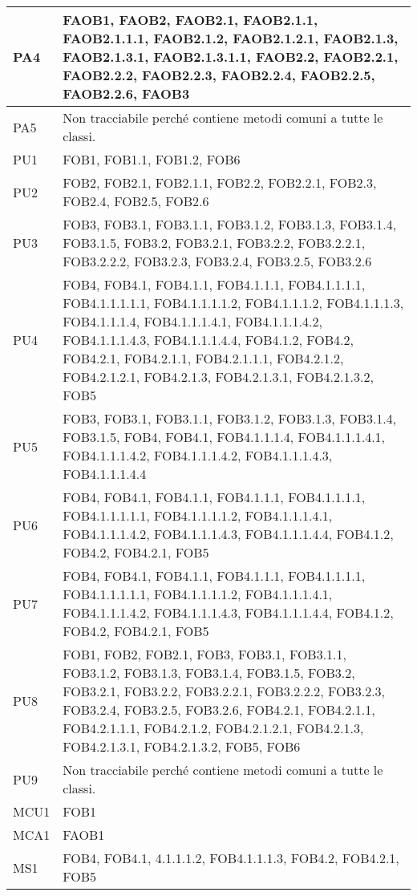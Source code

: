 {{\begin{longtable}{p{} p{}}
\midrule
PA4		&	{FAOB1, FAOB2, FAOB2.1, FAOB2.1.1, FAOB2.1.1.1, FAOB2.1.2, FAOB2.1.2.1, FAOB2.1.3, FAOB2.1.3.1, FAOB2.1.3.1.1, FAOB2.2, FAOB2.2.1, FAOB2.2.2, FAOB2.2.3, FAOB2.2.4, FAOB2.2.5, FAOB2.2.6, FAOB3}\\
\midrule
PA5	&    Non tracciabile perché contiene metodi comuni a tutte le classi.\\
\midrule
PU1		&	{FOB1, FOB1.1, FOB1.2, FOB6}\\
\midrule
PU2		&	{FOB2, FOB2.1, FOB2.1.1, FOB2.2, FOB2.2.1, FOB2.3, FOB2.4, FOB2.5, FOB2.6}\\
\midrule
PU3		&	{FOB3, FOB3.1, FOB3.1.1, FOB3.1.2, FOB3.1.3, FOB3.1.4, FOB3.1.5, FOB3.2, FOB3.2.1, FOB3.2.2, FOB3.2.2.1, FOB3.2.2.2, FOB3.2.3, FOB3.2.4, FOB3.2.5, FOB3.2.6}\\
\midrule
PU4		&	{FOB4, FOB4.1, FOB4.1.1, FOB4.1.1.1, FOB4.1.1.1.1, FOB4.1.1.1.1.1, FOB4.1.1.1.1.2, FOB4.1.1.1.2, FOB4.1.1.1.3, FOB4.1.1.1.4, FOB4.1.1.1.4.1, FOB4.1.1.1.4.2, FOB4.1.1.1.4.3, FOB4.1.1.1.4.4, FOB4.1.2, FOB4.2, FOB4.2.1, FOB4.2.1.1, FOB4.2.1.1.1, FOB4.2.1.2, FOB4.2.1.2.1, FOB4.2.1.3, FOB4.2.1.3.1,  FOB4.2.1.3.2, FOB5}\\
\midrule
PU5		&	{FOB3, FOB3.1, FOB3.1.1, FOB3.1.2, FOB3.1.3, FOB3.1.4, FOB3.1.5, FOB4, FOB4.1, FOB4.1.1.1.4, FOB4.1.1.1.4.1, FOB4.1.1.1.4.2, FOB4.1.1.1.4.2, FOB4.1.1.1.4.3, FOB4.1.1.1.4.4}\\
\midrule
PU6		&	{FOB4, FOB4.1, FOB4.1.1, FOB4.1.1.1, FOB4.1.1.1.1, FOB4.1.1.1.1.1, FOB4.1.1.1.1.2, FOB4.1.1.1.4.1, FOB4.1.1.1.4.2, FOB4.1.1.1.4.3, FOB4.1.1.1.4.4, FOB4.1.2, FOB4.2, FOB4.2.1, FOB5}\\
\midrule
PU7	&	{FOB4, FOB4.1, FOB4.1.1, FOB4.1.1.1, FOB4.1.1.1.1, FOB4.1.1.1.1.1, FOB4.1.1.1.1.2, FOB4.1.1.1.4.1, FOB4.1.1.1.4.2, FOB4.1.1.1.4.3, FOB4.1.1.1.4.4, FOB4.1.2, FOB4.2, FOB4.2.1, FOB5}\\
\midrule
PU8	&	{FOB1, FOB2, FOB2.1, FOB3, FOB3.1, FOB3.1.1, FOB3.1.2, FOB3.1.3, FOB3.1.4, FOB3.1.5, FOB3.2, FOB3.2.1, FOB3.2.2, FOB3.2.2.1, FOB3.2.2.2, FOB3.2.3,  FOB3.2.4, FOB3.2.5, FOB3.2.6, FOB4.2.1, FOB4.2.1.1, FOB4.2.1.1.1, FOB4.2.1.2, FOB4.2.1.2.1, FOB4.2.1.3, FOB4.2.1.3.1, FOB4.2.1.3.2, FOB5, FOB6}\\
\midrule
PU9 &	Non tracciabile perché contiene metodi comuni a tutte le classi.\\
\midrule
MCU1 & {FOB1}\\
\midrule
MCA1 & {FAOB1}\\
\midrule
MS1		&	{FOB4, FOB4.1, 4.1.1.1.2, FOB4.1.1.1.3, FOB4.2, FOB4.2.1, FOB5}\\

\end{longtable}}}
